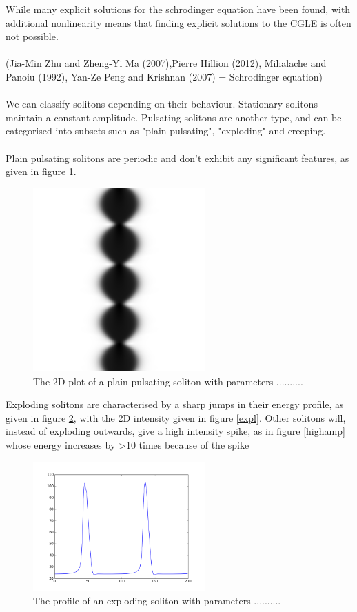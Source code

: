 \documentclass[a4paper,12pt]{report}
\begin{document}
While many explicit solutions for the schrodinger equation have been found, with additional nonlinearity means that finding explicit solutions to the CGLE is often not possible.
\\\\
(Jia-Min Zhu and Zheng-Yi Ma (2007),Pierre Hillion (2012), Mihalache and Panoiu (1992), Yan-Ze Peng and Krishnan (2007) =  Schrodinger equation)
\\\\
We can classify solitons depending on their behaviour.
Stationary solitons maintain a constant amplitude.
Pulsating solitons are another type, and can be categorised into subsets such as "plain pulsating",  "exploding" and creeping. \\\\
Plain pulsating solitons are periodic and don't exhibit any significant features, as given in figure \ref{plain}.
\begin{figure}[h]
\centering
\includegraphics[width=2.6in]{plain}
\caption{The 2D plot of a plain pulsating soliton with parameters ..........}
\label{plain} 
\end{figure}
Exploding solitons are characterised by a sharp jumps in their energy profile, as given in figure \ref{expl_profile}, with the 2D intensity given in figure \ref{expl}. Other solitons will, instead of exploding outwards, give a high intensity spike, as in figure \ref{highamp} whose energy increases by >10 times because of the spike
\begin{figure}[h]
\centering
\includegraphics[width=2.6in]{expl_profile}
\caption{The profile of an exploding soliton with parameters ..........}
\label{expl_profile} 
\end{figure}
\end{document}
